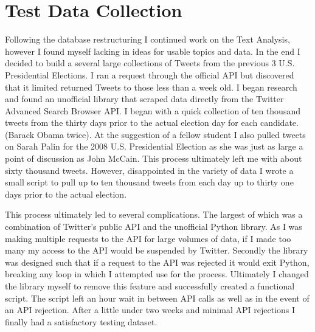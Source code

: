 \documentclass[12pt,a4paper]{report}
\begin{document}
  \section{Test Data Collection}
  Following the database restructuring I continued work on the Text Analysis, however I found myself lacking in ideas for usable topics and data. In the end I decided to build a several large collections of Tweets from the previous 3 U.S. Presidential Elections. I ran a request through the official API but discovered that it limited returned Tweets to those less than a week old. I began research and found an unofficial library that scraped data directly from the Twitter Advanced Search Browser API. I began with a quick collection of ten thousand tweets from the thirty days prior to the actual election day for each candidate. (Barack Obama twice). At the suggestion of a fellow student I also pulled tweets on Sarah Palin for the 2008 U.S. Presidential Election as she was just as large a point of discussion as John McCain. This process ultimately left me with about sixty thousand tweets. However, disappointed in the variety of data I wrote a small script to pull up to ten thousand tweets from each day up to thirty one days prior to the actual election. 
  \par
  This process ultimately led to several complications. The largest of which was a combination of Twitter’s public API and the unofficial Python library. As I was making multiple requests to the API for large volumes of data, if I made too many my access to the API would be suspended by Twitter. Secondly the library was designed such that if a request to the API was rejected it would exit Python, breaking any loop in which I attempted use for the process. Ultimately I changed the library myself to remove this feature and successfully created a functional script. The script left an hour wait in between API calls as well as in the event of an API rejection. After a little under two weeks and minimal API rejections I finally had a satisfactory testing dataset.
  \clearpage
\end{document}
